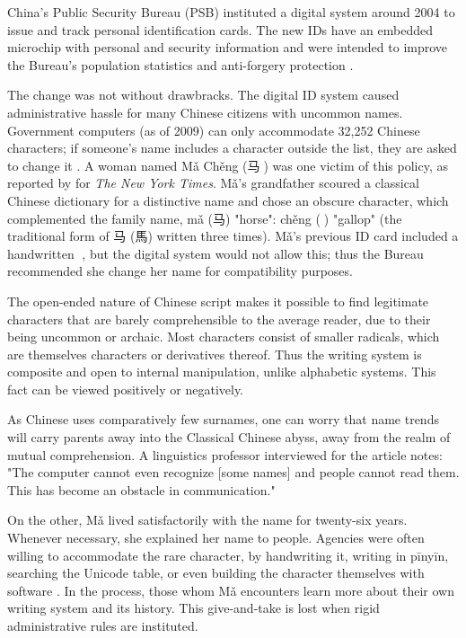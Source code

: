 China's Public Security Bureau (PSB) instituted a digital system around 2004 to
issue and track personal identification cards. The new IDs have an embedded
microchip with personal and security information and were intended to improve
the Bureau's population statistics and anti-forgery protection
\parencite{ciicn04}.

The change was not without drawbracks. The digital ID system caused
administrative hassle for many Chinese citizens with uncommon names. Government
computers (as of 2009) can only accommodate 32,252 Chinese characters; if
someone's name includes a character outside the list, they are asked to change
it \parencite{lafraniere09}. A woman named Mǎ Chěng ({\zafont 马}{\zbfont 𩧢})
was one victim of this policy, as reported by \textcite{lafraniere09} for
\textit{The New York Times}. Mǎ's grandfather scoured a classical Chinese
dictionary for a distinctive name and chose an obscure character, which
complemented the family name, mǎ ({\zafont 马}) "horse": chěng ({\zbfont 𩧢})
"gallop" (the traditional form of {\zafont 马} ({\zafont 馬}) written three
times). Mǎ's previous ID card included a handwritten {\zbfont 𩧢}, but the
digital system would not allow this; thus the Bureau recommended she change her
name for compatibility purposes.

The open-ended nature of Chinese script makes it possible to find legitimate
characters that are barely comprehensible to the average reader, due to their
being uncommon or archaic. Most characters consist of smaller radicals, which
are themselves characters or derivatives thereof. Thus the writing system is
composite and open to internal manipulation, unlike alphabetic systems. This
fact can be viewed positively or negatively.

As Chinese uses comparatively few surnames, one can worry that name trends will
carry parents away into the Classical Chinese abyss, away from the realm of
mutual comprehension. A linguistics professor interviewed for the
\textcite{lafraniere09} article notes: "The computer cannot even recognize [some
names] and people cannot read them. This has become an obstacle in
communication."

On the other, Mǎ lived satisfactorily with the name for twenty-six years.
Whenever necessary, she explained her name to people. Agencies were often
willing to accommodate the rare character, by handwriting it, writing in pīnyīn,
searching the Unicode table, or even building the character themselves with
software \parencite{martinsen08}. In the process, those whom Mǎ encounters learn
more about their own writing system and its history. This give-and-take is lost
when rigid administrative rules are instituted.

